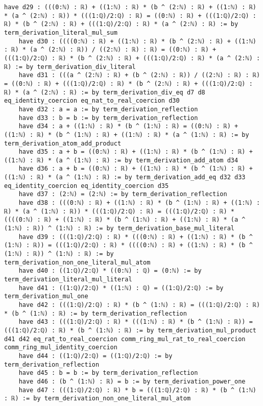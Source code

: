 \documentclass{article}
\begin{document}
\begin{tcolorbox}[colback=white!10, width=\linewidth]
\begin{lstlisting}[language=Lean4]
    have d29 : (((0:ℕ) : ℝ) + ((1:ℕ) : ℝ) * (b ^ (2:ℕ) : ℝ) + ((1:ℕ) : ℝ) * (a ^ (2:ℕ) : ℝ)) * (((1:ℚ)/2:ℚ) : ℝ) = ((0:ℕ) : ℝ) + (((1:ℚ)/2:ℚ) : ℝ) * (b ^ (2:ℕ) : ℝ) + (((1:ℚ)/2:ℚ) : ℝ) * (a ^ (2:ℕ) : ℝ) := by term_derivation_literal_mul_sum
    have d30 : ((((0:ℕ) : ℝ) + ((1:ℕ) : ℝ) * (b ^ (2:ℕ) : ℝ) + ((1:ℕ) : ℝ) * (a ^ (2:ℕ) : ℝ)) / ((2:ℕ) : ℝ) : ℝ) = ((0:ℕ) : ℝ) + (((1:ℚ)/2:ℚ) : ℝ) * (b ^ (2:ℕ) : ℝ) + (((1:ℚ)/2:ℚ) : ℝ) * (a ^ (2:ℕ) : ℝ) := by term_derivation_div_literal
    have d31 : (((a ^ (2:ℕ) : ℝ) + (b ^ (2:ℕ) : ℝ)) / ((2:ℕ) : ℝ) : ℝ) = ((0:ℕ) : ℝ) + (((1:ℚ)/2:ℚ) : ℝ) * (b ^ (2:ℕ) : ℝ) + (((1:ℚ)/2:ℚ) : ℝ) * (a ^ (2:ℕ) : ℝ) := by term_derivation_div_eq d7 d8 eq_identity_coercion eq_nat_to_real_coercion d30
    have d32 : a = a := by term_derivation_reflection
    have d33 : b = b := by term_derivation_reflection
    have d34 : a + ((1:ℕ) : ℝ) * (b ^ (1:ℕ) : ℝ) = ((0:ℕ) : ℝ) + ((1:ℕ) : ℝ) * (b ^ (1:ℕ) : ℝ) + ((1:ℕ) : ℝ) * (a ^ (1:ℕ) : ℝ) := by term_derivation_atom_add_product
    have d35 : a + b = ((0:ℕ) : ℝ) + ((1:ℕ) : ℝ) * (b ^ (1:ℕ) : ℝ) + ((1:ℕ) : ℝ) * (a ^ (1:ℕ) : ℝ) := by term_derivation_add_atom d34
    have d36 : a + b = ((0:ℕ) : ℝ) + ((1:ℕ) : ℝ) * (b ^ (1:ℕ) : ℝ) + ((1:ℕ) : ℝ) * (a ^ (1:ℕ) : ℝ) := by term_derivation_add_eq d32 d33 eq_identity_coercion eq_identity_coercion d35
    have d37 : (2:ℕ) = (2:ℕ) := by term_derivation_reflection
    have d38 : (((0:ℕ) : ℝ) + ((1:ℕ) : ℝ) * (b ^ (1:ℕ) : ℝ) + ((1:ℕ) : ℝ) * (a ^ (1:ℕ) : ℝ)) * (((1:ℚ)/2:ℚ) : ℝ) = (((1:ℚ)/2:ℚ) : ℝ) * ((((0:ℕ) : ℝ) + ((1:ℕ) : ℝ) * (b ^ (1:ℕ) : ℝ) + ((1:ℕ) : ℝ) * (a ^ (1:ℕ) : ℝ)) ^ (1:ℕ) : ℝ) := by term_derivation_base_mul_literal
    have d39 : (((1:ℚ)/2:ℚ) : ℝ) * (((0:ℕ) : ℝ) + ((1:ℕ) : ℝ) * (b ^ (1:ℕ) : ℝ)) = (((1:ℚ)/2:ℚ) : ℝ) * ((((0:ℕ) : ℝ) + ((1:ℕ) : ℝ) * (b ^ (1:ℕ) : ℝ)) ^ (1:ℕ) : ℝ) := by term_derivation_non_one_literal_mul_atom
    have d40 : ((1:ℚ)/2:ℚ) * ((0:ℕ) : ℚ) = (0:ℕ) := by term_derivation_literal_mul_literal
    have d41 : ((1:ℚ)/2:ℚ) * ((1:ℕ) : ℚ) = ((1:ℚ)/2:ℚ) := by term_derivation_mul_one
    have d42 : (((1:ℚ)/2:ℚ) : ℝ) * (b ^ (1:ℕ) : ℝ) = (((1:ℚ)/2:ℚ) : ℝ) * (b ^ (1:ℕ) : ℝ) := by term_derivation_reflection
    have d43 : (((1:ℚ)/2:ℚ) : ℝ) * (((1:ℕ) : ℝ) * (b ^ (1:ℕ) : ℝ)) = (((1:ℚ)/2:ℚ) : ℝ) * (b ^ (1:ℕ) : ℝ) := by term_derivation_mul_product d41 d42 eq_rat_to_real_coercion comm_ring_mul_rat_to_real_coercion comm_ring_mul_identity_coercion
    have d44 : ((1:ℚ)/2:ℚ) = ((1:ℚ)/2:ℚ) := by term_derivation_reflection
    have d45 : b = b := by term_derivation_reflection
    have d46 : (b ^ (1:ℕ) : ℝ) = b := by term_derivation_power_one
    have d47 : (((1:ℚ)/2:ℚ) : ℝ) * b = (((1:ℚ)/2:ℚ) : ℝ) * (b ^ (1:ℕ) : ℝ) := by term_derivation_non_one_literal_mul_atom

\end{lstlisting}
\end{tcolorbox}
\end{document}
